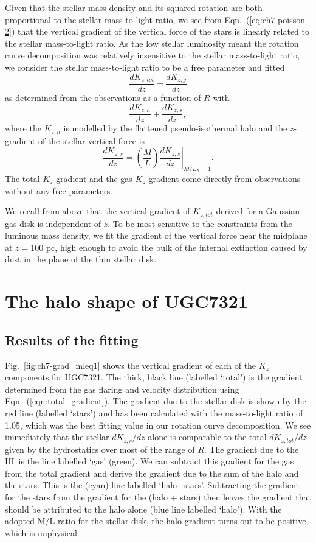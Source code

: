 \documentclass[traditabstract]{aa} %
\newcommand\HI{H{\small I}}
\begin{document}
Given that the stellar mass density and its squared rotation are both
proportional to the stellar mass-to-light ratio, we see from
Eqn.~(\ref{eq:ch7-poisson-2}) that the vertical gradient of the vertical
force of the stars is linearly related to the stellar mass-to-light
ratio.  As the low stellar luminosity meant the rotation curve
decomposition was relatively insensitive to the stellar mass-to-light
ratio, we consider the stellar mass-to-light ratio to be a free
parameter and fitted
$$
\frac{dK_{z,tot}}{dz} - \frac{dK_{z,g}}{dz}
$$
 as determined from the observations as a function of $R$ with  
$$
\frac{dK_{z,h}}{dz} + \frac{dK_{z,s}}{dz},
$$
where the $K_{z,h}$ is modelled by the flattened
pseudo-isothermal halo and the $z$-gradient of the stellar vertical
force is 
$$
\frac{dK_{z,s}}{dz} =
\left.\left(\frac{M}{L}\right)\frac{dK_{z,s}}{dz}\right| _{M/L_R=1}.
$$ 
The total
$K_z$ gradient and the gas $K_z$ gradient come directly from
observations without any free parameters. 

We recall from above that the vertical gradient of $K_{z,tot}$
derived for a Gaussian gas disk is independent of $z$.  To be most
sensitive to the constraints from the luminous mass density, we fit
the gradient of the vertical force near the midplane at $z=100$ pc,
high enough to avoid the bulk of the internal extinction caused by
dust in the plane of the thin stellar disk.



\section{The halo shape of UGC7321}
\label{sec:ch7-halo_fit}

\subsection{Results of the fitting}


Fig.~\ref{fig:ch7-grad_mleq1} shows the vertical gradient of each of
the $K_z$ components for UGC7321. The thick, black line (labelled `total')
is the gradient determined from the gas flaring and velocity distribution
using Eqn.~(\ref{eqn:total_gradient}). The gradient due to the stellar disk 
is shown by the red line (labelled `stars') and has been calculated
with the mass-to-light ratio of 1.05, which was the best fitting
value in our rotation curve decomposition. We see immediately
that the stellar $dK_{z,s}/dz$ alone is comparable to the total
$dK_{z,tot}/dz$ given by the hydrostatics over most of the range of
$R$. The gradient due to the \HI\ is the line labelled `gas' (green). 
We can subtract this gradient for the gas from the total gradient and
derive the gradient due to the sum of the halo and the stars. This is the
(cyan) line labelled `halo+stars'. Subtracting the gradient for the stars
from the gradient for the (halo + stars) then leaves the gradient that 
should be attributed to the halo alone (blue line labelled `halo'). 
With the adopted M/L ratio for the stellar disk, the halo gradient turns
out to be positive, which is unphysical.
\end{document}

